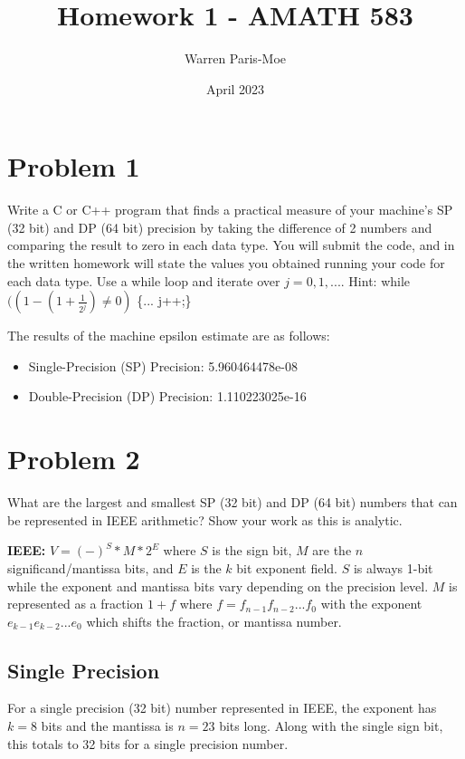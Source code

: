 \documentclass[12pt,letter]{article}
\title{Homework 1 - AMATH 583}
\author{Warren Paris-Moe}
\date{April 2023}
\begin{document}
\maketitle

\section{Problem 1}
\begin{mdframed}
Write a C or C++ program that finds a practical measure of your machine’s SP (32 bit) and DP (64 bit)
precision by taking the difference of 2 numbers and comparing the result to zero in each data type. You
will submit the code, and in the written homework will state the values you obtained running your code
for each data type. Use a while loop and iterate over $j = 0, 1,...$. 
Hint: while $((1-(1+\frac{1}{2^j})\neq0)$ \{... j++;\}
\end{mdframed}

The results of the machine epsilon estimate are as follows:
\begin{itemize}
    \item Single-Precision (SP) Precision: 5.960464478e-08
    \item Double-Precision (DP) Precision: 1.110223025e-16
\end{itemize}

\section{Problem 2}
\begin{mdframed}
What are the largest and smallest SP (32 bit) and DP (64 bit) numbers that can be represented in IEEE
arithmetic? Show your work as this is analytic.
\end{mdframed}

\textbf{IEEE:} $V = (-)^S * M * 2^E$ where $S$ is the sign bit, $M$ are the $n$ significand/mantissa bits, and $E$ is the $k$ bit exponent field. $S$ is always 1-bit while the exponent and mantissa bits vary depending on the precision level. $M$ is represented as a fraction $1+f$ where $f=f_{n-1}f_{n-2}...f_0$ with the exponent $e_{k-1}e_{k-2}...e_0$ which shifts the fraction, or mantissa number.

\subsection{Single Precision}
For a single precision (32 bit) number represented in IEEE, the exponent has $k=8$ bits and the mantissa is $n=23$ bits long. Along with the single sign bit, this totals to 32 bits for a single precision number. \\
\end{document}
